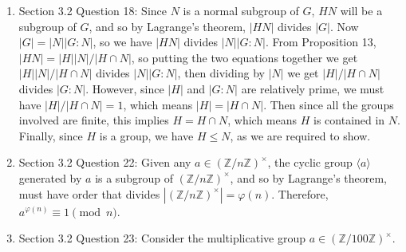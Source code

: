 \documentclass{article}
\begin{document}
\begin{enumerate}
  \item Section 3.2 Question 18: Since $N$ is a normal subgroup of $G$,
    $HN$ will be a subgroup of $G$, and so by Lagrange's theorem, $|HN|$
    divides $|G|$. Now $|G|=|N||G:N|$, so we have $|HN|$ divides
    $|N||G:N|$. From Proposition 13, $|HN|=|H||N|/|H\cap N|$, so putting
    the two equations together we get $|H||N|/|H\cap N|$ divides
    $|N||G:N|$, then dividing by $|N|$ we get $|H|/|H\cap N|$ divides
    $|G:N|$. However, since $|H|$ and $|G:N|$ are relatively prime, we must
    have $|H|/|H\cap N|=1$, which means $|H|=|H\cap N|$. Then since all the
    groups involved are finite, this implies $H=H\cap N$, which means $H$
    is contained in $N$. Finally, since $H$ is a group, we have $H\leq N$,
    as we are required to show.

  \item Section 3.2 Question 22: Given any
    $a\in(\mathbb{Z}/n\mathbb{Z})^\times$, the cyclic group $\langle
    a\rangle$ generated by $a$ is a subgroup of
    $(\mathbb{Z}/n\mathbb{Z})^\times$, and so by Lagrange's theorem, must
    have order that divides $|(\mathbb{Z}/n\mathbb{Z})^\times|=\varphi(n)$.
    Therefore, $a^{\varphi(n)}\equiv 1\pmod{n}$.

  \item Section 3.2 Question 23: Consider the multiplicative group
    $a\in(\mathbb{Z}/100\mathbb{Z})^\times$.
\end{enumerate}
\end{document}

